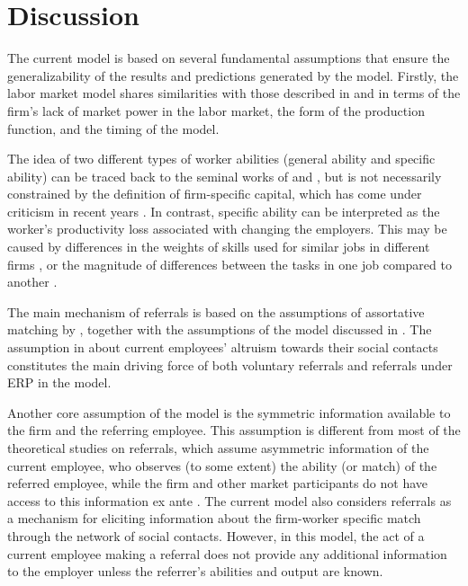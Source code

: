\documentclass[12pt]{article}
\begin{document}
\section{Discussion} \label{sec:discussion}

The current model is based on several fundamental assumptions that ensure the generalizability of the results and predictions generated by the model. Firstly, the labor market model shares similarities with those described in \cite{gibbons1999theory} and \cite{ekinci2016employee} in terms of the firm's lack of market power in the labor market, the form of the production function, and the timing of the model. 

The idea of two different types of worker abilities (general ability and specific ability) can be traced back to the seminal works of \cite{becker1962investment, becker1975investment} and \cite{jovanovic1979job}, but is not necessarily constrained by the definition of firm-specific capital, which has come under criticism in recent years  \citep{gibbons2004task, gathmann2010general}. In contrast, specific ability can be interpreted as the worker's productivity loss associated with changing the employers. This may be caused by differences in the weights of skills used for similar jobs in different firms \citep{lazear2009firm}, or the magnitude of differences between the tasks in one job compared to another \citep{gibbons2004task}. 

The main mechanism of referrals is based on the assumptions of assortative matching by \cite{montgomery1991social}, together with the assumptions of the model discussed in \cite{friebel2023employee}. The assumption in \cite{friebel2023employee} about current employees' altruism towards their social contacts constitutes the main driving force of both voluntary referrals and referrals under ERP in the model. 

Another core assumption of the model is the symmetric information available to the firm and the referring employee. This assumption is different from most of the theoretical studies on referrals, which assume asymmetric information of the current employee, who observes (to some extent) the ability (or match) of the referred employee, while the firm and other market participants do not have access to this information ex ante \citep{saloner1985old, beaman2012gets, ekinci2016employee}. The current model also considers referrals as a mechanism for eliciting information about the firm-worker specific match through the network of social contacts. However, in this model, the act of a current employee making a referral does not provide any additional information to the employer unless the referrer's abilities and output are known.
\end{document}
